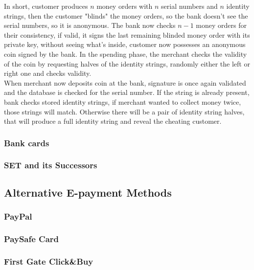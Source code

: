 \documentclass[a4paper, 10 pt, conference]{ieeeconf}
\begin{document}
In short, customer produces $n$ money orders with $n$ serial numbers and $n$ identity strings, then the customer "blinds" the money orders, so the bank doesn't see the serial numbers, so it is anonymous. The bank now checks $n-1$ money orders for their consistency, if valid, it signs the last remaining blinded money order with its private key, without seeing what's inside, customer now possesses an anonymous coin signed by the bank. In the spending phase, the merchant checks the validity of the coin by requesting halves of the identity strings, randomly either the left or right one and checks validity.\\
When merchant now deposits coin at the bank, signature is once again validated and the database is checked for the serial number. If the string is already present, bank checks stored identity strings, if merchant wanted to collect money twice, those strings will match. Otherwise there will be a pair of identity string halves, that will produce a full identity string and reveal the cheating customer. 

\vspace{0.5cm}
\subsubsection{\textbf{Bank cards}}

\subsubsection{\textbf{SET and its Successors}}


\subsection{\textbf{Alternative E-payment Methods}}

\subsubsection{\textbf{PayPal}}

\subsubsection{\textbf{PaySafe Card}}

\subsubsection{\textbf{First Gate Click\&Buy}}
\end{document}
